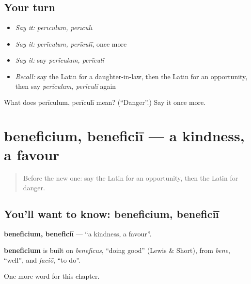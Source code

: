 \subsection*{Your turn}
\begin{itemize}
\raggedright
  \item \emph{Say it:} \emph{perīculum, perīculī}
  \item \emph{Say it:} \emph{perīculum, perīculī}, once more
  \item \emph{Say it:} say \emph{perīculum, perīculī}
  \item \emph{Recall:} say the Latin for a daughter-in-law, then the Latin for an opportunity, then say \emph{perīculum, perīculī} again
\end{itemize}

\begin{tcolorbox}[breakable,colback=teal!4,colframe=teal!35!black,title={Before you move on}]
What does perīculum, perīculī mean? (\textquotedblleft{}Danger\textquotedblright{}.) Say it once more.
\end{tcolorbox}
\section[beneficium, beneficiī]{beneficium, beneficiī — a kindness, a favour}

\label{lesson:LA-C248-beneficium}



\begin{quote}
Before the new one: say the Latin for an opportunity, then the Latin for danger.
\end{quote}

\subsection*{You'll want to know: beneficium, beneficiī}
\textbf{beneficium, beneficiī} — \textquotedblleft{}a kindness, a favour\textquotedblright{}.

\begin{cousinweb}
\textbf{beneficium} is built on \emph{beneficus}, \textquotedblleft{}doing good\textquotedblright{} (Lewis \& Short), from \emph{bene}, \textquotedblleft{}well\textquotedblright{}, and \emph{faciō}, \textquotedblleft{}to do\textquotedblright{}.
\end{cousinweb}

\begin{grammarlens}[title={What you've built}]
One more word for this chapter.
\end{grammarlens}

